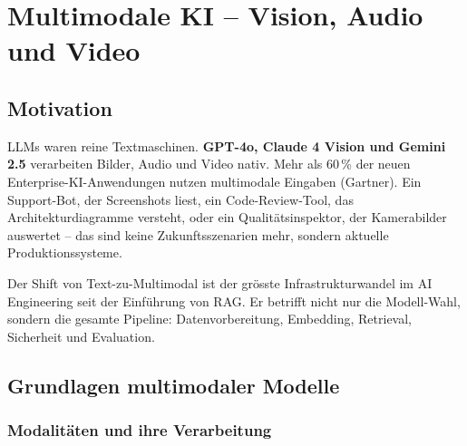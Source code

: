 \chapter{Multimodale KI -- Vision, Audio und Video}
\label{chap:multimodal}


\section{Motivation}

LLMs waren reine Textmaschinen. \textbf{GPT-4o, Claude 4 Vision und Gemini 2.5} verarbeiten Bilder, Audio und Video nativ. Mehr als 60\,\% der neuen Enterprise-KI-Anwendungen nutzen multimodale Eingaben (Gartner). Ein Support-Bot, der Screenshots liest, ein Code-Review-Tool, das Architekturdiagramme versteht, oder ein Qualitätsinspektor, der Kamerabilder auswertet -- das sind keine Zukunftsszenarien mehr, sondern aktuelle Produktionssysteme.

Der Shift von Text-zu-Multimodal ist der grösste Infrastrukturwandel im AI Engineering seit der Einführung von RAG. Er betrifft nicht nur die Modell-Wahl, sondern die gesamte Pipeline: Datenvorbereitung, Embedding, Retrieval, Sicherheit und Evaluation.

\section{Grundlagen multimodaler Modelle}

\subsection{Modalitäten und ihre Verarbeitung}

